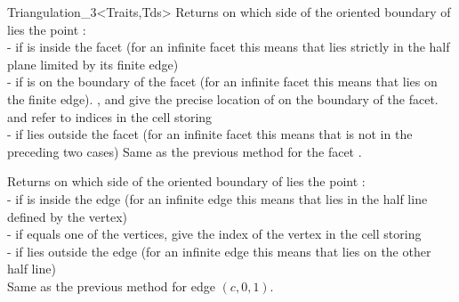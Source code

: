 \begin{ccClassTemplate}{Triangulation_3<Traits,Tds>}
{Returns on which side of the oriented boundary of  lies 
the point :\\
-  if  is inside the facet (for an
infinite facet this means that  lies strictly in the half plane
limited by its finite edge) \\
-  if  is on the boundary of the facet
(for an infinite facet this means that  lies on the finite
edge). ,  and  give the precise location of
 on the boundary of the facet.  and  refer to
indices in the cell  storing \\
-  if  lies outside the facet (for
an infinite facet this means that  is not in the preceding two
cases)
}
\ccGlue
{}
{Same as the previous method for the facet .}

{Returns on which side of the oriented boundary of  lies 
the point :\\
-  if  is inside the edge (for an
infinite edge this means that  lies in the half line defined by
the vertex)\\ 
-  if  equals one of the vertices,
 give the index of the vertex in the cell storing \\
-  if  lies outside the edge (for
an infinite edge this means that  lies on the other half line)\\ 
}
\ccGlue
{}
{Same as the previous method for edge $(c,0,1)$.}


\end{ccClassTemplate}

